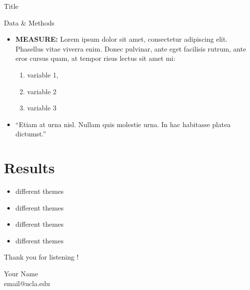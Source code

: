 \documentclass[serif, aspectratio=169]{beamer}
\begin{document}
\begin{frame}{Title}
   \begin{block}{Data \& Methods}
		\begin{itemize}
			\item \textbf{MEASURE:} Lorem ipsum dolor sit amet, consectetur adipiscing elit. Phasellus vitae viverra enim. Donec pulvinar, ante eget facilisis rutrum, ante eros cursus quam, at tempor risus lectus sit amet mi:
                \begin{enumerate}
                    \item variable 1,
                    \item variable 2
                    \item variable 3
                \end{enumerate}
                \item \enquote{Etiam at urna nisl. Nullam quis molestie urna. In hac habitasse platea dictumst.}
		\end{itemize}
	\end{block}
\end{frame}


\section{Results}
\begin{frame}
    \begin{itemize}
        \item different themes
        \item different themes
        \item different themes
        \item different themes
    \end{itemize}
\end{frame}


\begin{frame}
\begin{center}
{ Thank you for listening !}
\vspace{1cm}

Your Name \\[1em]
email@ucla.edu 
\end{center}
\end{frame}
\end{document}
